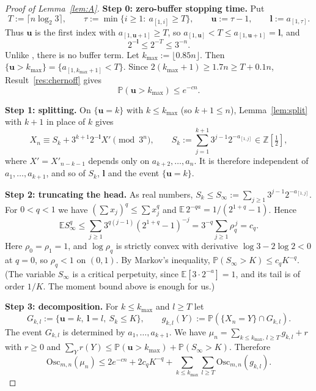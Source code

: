 \documentclass[11pt]{amsart}
\theoremstyle{remark}
\newcommand{\E}{\mathbb{E}}
\renewcommand{\P}{\mathbb{P}}
\newcommand{\Z}{\mathbb{Z}}
\newcommand{\Osc}{\mathrm{Osc}}
\newcommand{\T}[1]{\cite[#1]{Tao22}}   %
\theoremstyle{plain}
\begin{document}
\begin{proof}[Proof of Lemma~\ref{lem:A}]
\textbf{Step 0: zero-buffer stopping time.} Put
\[
T:=\lceil n\log_2 3\rceil,\qquad \tau:=\min\{i\ge1:\ a_{[1,i]}\ge T\},\qquad \mathbf u:=\tau-1,\qquad \mathbf l:=a_{[1,\tau]}.
\]
Thus $\mathbf u$ is the first index with $a_{[1,\mathbf u+1]}\ge T$, so $a_{[1,\mathbf u]}<T\le a_{[1,\mathbf u+1]}=\mathbf l$, and
\begin{equation}\label{eq:A-noBuffer}
2^{-\mathbf l}\le 2^{-T}\le 3^{-n}.
\end{equation}
Unlike \T{(6.6)--(6.8)}, there is no buffer term. Let $k_{\max}:=\lfloor0.85n\rfloor$. Then $\{\mathbf u>k_{\max}\}=\{a_{[1,k_{\max}+1]}<T\}$. Since $2(k_{\max}+1)\ge1.7n\ge T+0.1n$, Result~\ref{res:chernoff} gives
\begin{equation}\label{eq:A-late}
\P(\mathbf u>k_{\max})\le e^{-cn}.
\end{equation}

\textbf{Step 1: splitting.} On $\{\mathbf u=k\}$ with $k\le k_{\max}$ (so $k+1\le n$), Lemma~\ref{lem:split} with $k+1$ in place of $k$ gives
\begin{equation}\label{eq:A-split}
X_n\equiv S_k+3^{k+1}2^{-\mathbf l}X'\pmod{3^n},\qquad S_k:=\sum_{j=1}^{k+1}3^{j-1}2^{-a_{[1,j]}}\in\Z[\tfrac12],
\end{equation}
where $X'=X'_{n-k-1}$ depends only on $a_{k+2},\dots,a_n$. It is therefore independent of $a_1,\dots,a_{k+1}$, and so of $S_k$, $\mathbf l$ and the event $\{\mathbf u=k\}$.

\textbf{Step 2: truncating the head.} As real numbers, $S_k\le S_\infty:=\sum_{j\ge1}3^{j-1}2^{-a_{[1,j]}}$. For $0<q<1$ we have $(\sum x_j)^q\le\sum x_j^q$ and $\E\,2^{-qa}=1/(2^{1+q}-1)$. Hence
\[
\E S_\infty^q\le\sum_{j\ge1}3^{q(j-1)}(2^{1+q}-1)^{-j}=3^{-q}\sum_{j\ge1}\rho_q^{\,j}=c_q .
\]
Here $\rho_0=\rho_1=1$, and $\log\rho_q$ is strictly convex with derivative $\log3-2\log2<0$ at $q=0$, so $\rho_q<1$ on $(0,1)$. By Markov's inequality, $\P(S_\infty>K)\le c_qK^{-q}$. (The variable $S_\infty$ is a critical perpetuity, since $\E[3\cdot2^{-a}]=1$, and its tail is of order $1/K$. The moment bound above is enough for us.)

\textbf{Step 3: decomposition.} For $k\le k_{\max}$ and $l\ge T$ let
\[
G_{k,l}:=\{\mathbf u=k,\ \mathbf l=l,\ S_k\le K\},\qquad g_{k,l}(Y):=\P(\{X_n=Y\}\cap G_{k,l}).
\]
The event $G_{k,l}$ is determined by $a_1,\dots,a_{k+1}$. We have $\mu_n=\sum_{k\le k_{\max},\,l\ge T}g_{k,l}+r$ with $r\ge0$ and $\sum_Yr(Y)\le\P(\mathbf u>k_{\max})+\P(S_\infty>K)$. Therefore
\begin{equation}\label{eq:A-decomp}
\Osc_{m,n}(\mu_n)\le 2e^{-cn}+2c_qK^{-q}+\sum_{k\le k_{\max}}\sum_{l\ge T}\Osc_{m,n}(g_{k,l}).
\end{equation}


\end{proof}
\end{document}
